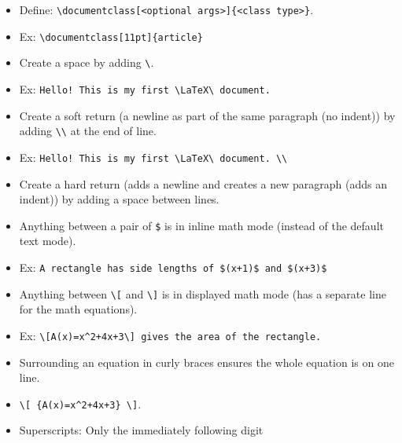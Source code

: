 \documentclass[11pt]{article}
\begin{document}
    \begin{itemize}
        \item Define: {\verb|\documentclass[<optional args>]{<class type>}|}.
        \item Ex: \verb|\documentclass[11pt]{article}|

        \item Create a space by adding \verb|\|.
        \item Ex: \verb|Hello! This is my first \LaTeX\ document.|

        \item Create a soft return (a newline as part of the same paragraph (no indent)) by adding \verb|\\| at the end of line.
        \item Ex: \verb|Hello! This is my first \LaTeX\ document. \\|
    
        \item Create a hard return (adds a newline and creates a new paragraph (adds an indent)) by adding a space between lines.

        \item Anything between a pair of \verb|$| is in inline math mode (instead of the default text mode).
        \item Ex: \verb|A rectangle has side lengths of $(x+1)$ and $(x+3)$|

        \item Anything between \verb|\[| and \verb|\]| is in displayed math mode (has a separate line for the math equations).
        \item Ex: \verb|\[A(x)=x^2+4x+3\] gives the area of the rectangle.|

        \item Surrounding an equation in curly braces ensures the whole equation is on one line.
        \item \verb|\[ {A(x)=x^2+4x+3} \]|.
        
        \item Superscripts: Only the immediately following digit 
    \end{itemize}
    
\end{document}
